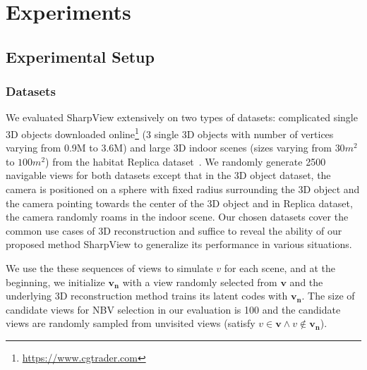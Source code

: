 \section*{Experiments\label{exp}}
\subsection{Experimental Setup}
\subsubsection{Datasets}
We evaluated SharpView extensively on two types of datasets: complicated single 3D objects downloaded online\footnote{\url{https://www.cgtrader.com}} (3 single 3D objects with number of vertices varying from 0.9M to 3.6M) and large 3D indoor scenes (sizes varying from $30m^2$ to $100m^2$) from the habitat Replica dataset~\cite{replica19arxiv}.
We randomly generate 2500 navigable views for both datasets except that in the 3D object dataset, the camera is positioned on a sphere with fixed radius surrounding the 3D object and the camera pointing towards the center of the 3D object and in Replica dataset, the camera randomly roams in the indoor scene.
Our chosen datasets cover the common use cases of 3D reconstruction and suffice to reveal the ability of our proposed method SharpView to generalize its performance in various situations.

We use the these sequences of views to simulate $v$ for each scene, 
and at the beginning, we initialize $\bm{v_n}$ with a view randomly selected from $\bm{v}$ and the underlying 3D reconstruction method trains its latent codes with $\bm{v_n}$.
The size of candidate views for NBV selection in our evaluation is 100 and the candidate views are randomly sampled from unvisited views (satisfy $v\in\bm{v}\land v\notin \bm{v_n}$).


